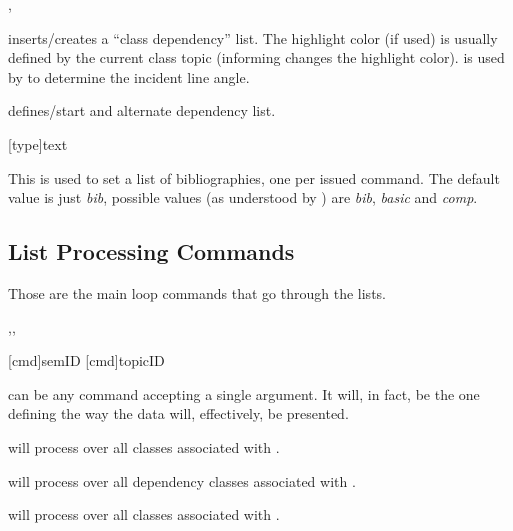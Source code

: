 \documentclass[article,nogeometry,english,tocdepth=3,secdepth=3]{ufrgscca} %
\begin{document}
\begin{codedescribe}{\depdef,\altdef}
    \begin{codesyntax}%
        \tsmacro{\altdef}{}
    \end{codesyntax}
\tsmacro{\depdef}{} inserts/creates a “class dependency” list. The highlight color (if used) is usually defined by the current class topic (informing  changes the highlight color).  is used by  to determine the incident line angle.

\tsmacro{\altdef}{} defines/start and alternate dependency list.
\end{codedescribe}

\begin{codedescribe}{\bibdef}
    \begin{codesyntax}%
        \tsmacro{\bibdef}[type]{text}
    \end{codesyntax}
This is used to set a list of bibliographies, one per issued command. The default  value is just \emph{bib}, possible values (as understood by ) are \emph{bib}, \emph{basic} and \emph{comp}.
\end{codedescribe}

\subsection{List Processing Commands}
Those are the main loop commands that go through the lists.
\begin{codedescribe}{\LstClass,\LstDep,\LstTopic}
    \begin{codesyntax}
        \tsmacro{\LstClass}[cmd]{semID}
        \tsmacro{\LstTopic}[cmd]{topicID}
    \end{codesyntax}
 can be any command accepting a single argument. It will, in fact, be the one defining the way the data will, effectively, be presented.

\tsmacro{\LstClass}{} will process  over all classes associated with .

\tsmacro{\LstDep}{} will process  over all dependency classes associated with .

\tsmacro{\LstTopic}{} will process  over all classes associated with .

\end{codedescribe}
\end{document}
